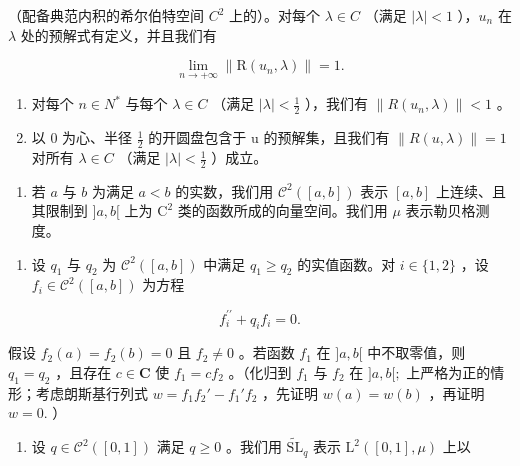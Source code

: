 （配备典范内积的希尔伯特空间 \(C^{2}\) 上的）。对每个 \(\lambda \in C\) （满足 \(|\lambda| < 1\) ），\(u_{n}\) 在 \(\lambda\) 处的预解式有定义，并且我们有

\[
\lim _ {n \to + \infty} \| \mathrm{R} (u _ {n}, \lambda) \| = 1.
\]

\begin{enumerate}
\def\labelenumi{\alph{enumi})}
\setcounter{enumi}{3}
\tightlist
\item
  对每个 \(n \in N^{*}\) 与每个 \(\lambda \in C\) （满足 \(|\lambda| < \frac{1}{2}\) ），我们有 \(\|R(u_{n}, \lambda)\| < 1\) 。
\item
  以 0 为心、半径 \(\frac{1}{2}\) 的开圆盘包含于 u 的预解集，且我们有 \(\|R(u,\lambda)\|=1\) 对所有 \(\lambda\in C\) （满足 \(|\lambda|<\frac{1}{2}\) ）成立。
\end{enumerate}

\begin{enumerate}
\def\labelenumi{\arabic{enumi})}
\setcounter{enumi}{19}
\tightlist
\item
  若 \(a\) 与 \(b\) 为满足 \(a < b\) 的实数，我们用 \(\mathcal{C}^2([a,b])\) 表示 \([a,b]\) 上连续、且其限制到 \(]a,b[\) 上为 \(\mathrm{C}^2\) 类的函数所成的向量空间。我们用 \(\mu\) 表示勒贝格测度。
\end{enumerate}

\begin{enumerate}
\def\labelenumi{\alph{enumi})}
\tightlist
\item
  设 \(q_{1}\) 与 \(q_{2}\) 为 \(\mathcal{C}^{2}([a,b])\) 中满足 \(q_{1} \geqslant q_{2}\) 的实值函数。对 \(i \in \{1,2\}\) ，设 \(f_{i} \in \mathcal{C}^{2}([a,b])\) 为方程
\end{enumerate}

\[
f _ {i} ^ {\prime \prime} + q _ {i} f _ {i} = 0.
\]

假设 \(f_{2}(a) = f_{2}(b) = 0\) 且 \(f_{2} \neq 0\) 。若函数 \(f_{1}\) 在 \(]a, b[\) 中不取零值，则 \(q_{1} = q_{2}\) ，且存在 \(c \in \mathbf{C}\) 使 \(f_{1} = cf_{2}\) 。（化归到 \(f_1\) 与 \(f_2\) 在 \(]a, b[;\) 上严格为正的情形；考虑朗斯基行列式 \(w = f_1f_2' - f_1'f_2\) ，先证明 \(w(a) = w(b)\) ，再证明 \(w = 0.\) ）

\begin{enumerate}
\def\labelenumi{\alph{enumi})}
\setcounter{enumi}{1}
\tightlist
\item
  设 \(q \in \mathcal{C}^2([0,1])\) 满足 \(q \geqslant 0\) 。我们用 \(\widetilde{\mathrm{SL}}_q\) 表示 \(\mathrm{L}^2([0,1],\mu)\) 上以
\end{enumerate}

